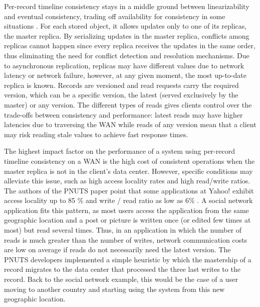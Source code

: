 \documentclass[man,floatsintext,12pt]{apa6}
\begin{document}
Per-record timeline consistency stays in a middle ground between
linearizability \parencite{Herlihy1990} and eventual consistency, trading off
availability for consistency in some situations \parencite{Cooper2008}. For each
stored object, it allows updates only to one of its replicas, the master
replica. By serializing updates in the master replica, conflicts among replicas
cannot happen since every replica receives the updates in the same order, thus
eliminating the need for conflict detection and resolution mechanisms. Due to
asynchronous replication, replicas may have different values due to network
latency or network failure, however, at any given moment, the most up-to-date
replica is known. Records are versioned and read requests carry the required
version, which can be a specific version, the latest (served exclusively by the
master) or any version. The different types of reads gives clients control over
the trade-offs between consistency and performance: latest reads may have higher
latencies due to traversing the WAN while reads of any version mean that a
client may risk reading stale values to achieve fast response times.

The highest impact factor on the performance of a system using per-record
timeline consistency on a WAN is the high cost of consistent operations when
the master replica is not in the client's data center. However, specific
conditions may alleviate this issue, such as high access locality rates and
high read/write ratios. The authors of the PNUTS paper point that some
applications at Yahoo! exhibit access locality up to 85 \% and write / read
ratio as low as 6\% \parencite{Kadambi2011, Cooper2008}. A social network
application fits this pattern, as most users access the application from the
same geographic location and a post or picture is written once (or edited few
times at most) but read several times. Thus, in an application in which the
number of reads is much greater than the number of writes, network
communication costs are low on average if reads do not necessarily need the
latest version. The PNUTS developers implemented a simple heuristic by which
the mastership of a record migrates to the data center that processed the three
last writes to the record. Back to the social network example, this would be
the case of a user moving to another country and starting using the system from
this new geographic location.
\end{document}
